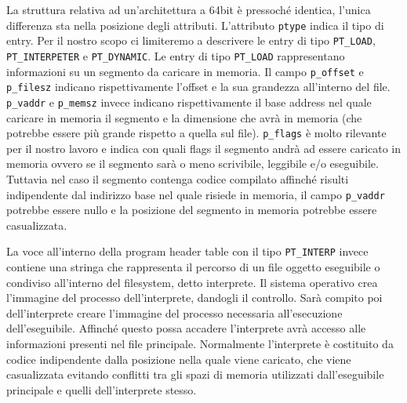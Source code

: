 La struttura relativa ad un'architettura a 64bit è pressoché identica,
l'unica differenza sta nella posizione degli attributi.  L'attributo
\lstinline{ptype} indica il tipo di entry. Per il nostro scopo ci
limiteremo a descrivere le entry di tipo \lstinline{PT_LOAD},
\lstinline{PT_INTERPETER} e \lstinline{PT_DYNAMIC}. Le entry di tipo
\lstinline{PT_LOAD} rappresentano informazioni su un segmento da
caricare in memoria. Il campo \lstinline{p_offset} e
\lstinline{p_filesz} indicano rispettivamente l'offset e la sua
grandezza all'interno del file. \lstinline{p_vaddr} e
\lstinline{p_memsz} invece indicano rispettivamente il base address
nel quale caricare in memoria il segmento e la dimensione che avrà in
memoria (che potrebbe essere più grande rispetto a quella sul
file). \lstinline{p_flags} è molto rilevante per il nostro lavoro e
indica con quali flags il segmento andrà ad essere caricato in memoria
ovvero se il segmento sarà o meno scrivibile, leggibile e/o
eseguibile. Tuttavia nel caso il segmento contenga codice compilato
affinché risulti indipendente dal indirizzo base nel quale risiede in
memoria, il campo \lstinline{p_vaddr} potrebbe essere nullo e la
posizione del segmento in memoria potrebbe essere casualizzata.

La voce all'interno della program header table con il tipo
\lstinline{PT_INTERP} invece contiene una stringa che rappresenta il
percorso di un file oggetto eseguibile o condiviso all'interno del
filesystem, detto interprete. Il sistema operativo crea l'immagine del
processo dell'interprete, dandogli il controllo. Sarà compito poi
dell'interprete creare l'immagine del processo necessaria
all'esecuzione dell'eseguibile. Affinché questo possa accadere
l'interprete avrà accesso alle informazioni presenti nel file
principale. Normalmente l'interprete è costituito da codice
indipendente dalla posizione nella quale viene caricato, che viene
casualizzata evitando conflitti tra gli spazi di memoria utilizzati
dall'eseguibile principale e quelli dell'interprete stesso.

